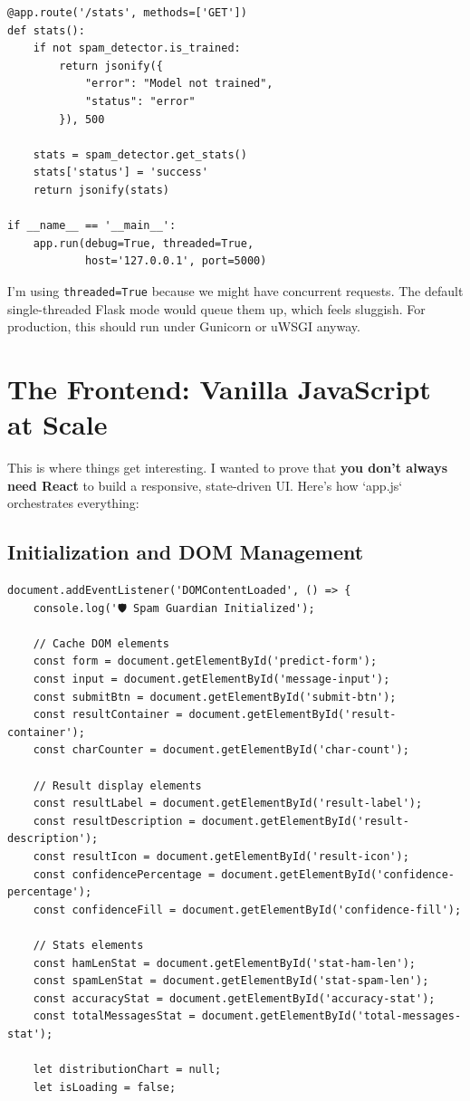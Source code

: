 \documentclass[12pt, a4paper]{article}
\begin{document}
\begin{verbatim}
@app.route('/stats', methods=['GET'])
def stats():
    if not spam_detector.is_trained:
        return jsonify({
            "error": "Model not trained",
            "status": "error"
        }), 500
    
    stats = spam_detector.get_stats()
    stats['status'] = 'success'
    return jsonify(stats)

if __name__ == '__main__':
    app.run(debug=True, threaded=True, 
            host='127.0.0.1', port=5000)
\end{verbatim}

\begin{devnote}
I'm using \texttt{threaded=True} because we might have concurrent requests. The default single-threaded Flask mode would queue them up, which feels sluggish. For production, this should run under Gunicorn or uWSGI anyway.
\end{devnote}

\section{The Frontend: Vanilla JavaScript at Scale}

This is where things get interesting. I wanted to prove that \textbf{you don't always need React} to build a responsive, state-driven UI. Here's how `app.js` orchestrates everything:

\subsection{Initialization and DOM Management}

\begin{verbatim}
document.addEventListener('DOMContentLoaded', () => {
    console.log('🛡️ Spam Guardian Initialized');
    
    // Cache DOM elements
    const form = document.getElementById('predict-form');
    const input = document.getElementById('message-input');
    const submitBtn = document.getElementById('submit-btn');
    const resultContainer = document.getElementById('result-container');
    const charCounter = document.getElementById('char-count');
    
    // Result display elements
    const resultLabel = document.getElementById('result-label');
    const resultDescription = document.getElementById('result-description');
    const resultIcon = document.getElementById('result-icon');
    const confidencePercentage = document.getElementById('confidence-percentage');
    const confidenceFill = document.getElementById('confidence-fill');
    
    // Stats elements
    const hamLenStat = document.getElementById('stat-ham-len');
    const spamLenStat = document.getElementById('stat-spam-len');
    const accuracyStat = document.getElementById('accuracy-stat');
    const totalMessagesStat = document.getElementById('total-messages-stat');
    
    let distributionChart = null;
    let isLoading = false;
\end{verbatim}
\end{document}

